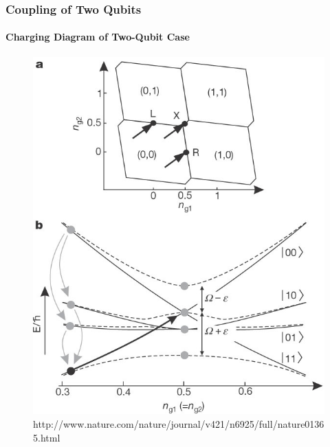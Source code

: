 \documentclass{beamer}
\begin{document}

\begin{frame}
    \frametitle{Coupling of Two Qubits}
    \framesubtitle{Charging Diagram of Two-Qubit Case}
    \begin{figure}[ht!]
        \centering
        \includegraphics[height=0.6\textheight]{img/charging-diagram.jpg}
        \caption{http://www.nature.com/nature/journal/v421/n6925/full/nature01365.html}
    \end{figure}
\end{frame}

\end{document}
